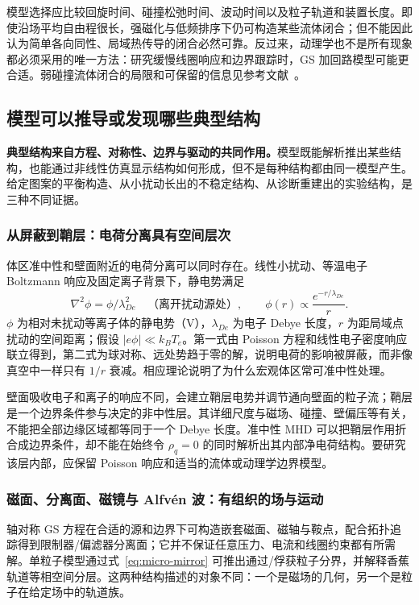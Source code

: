 \documentclass[12pt,fontset=none]{ctexart}
\numberwithin{equation}{section}
\numberwithin{table}{section}
\numberwithin{figure}{section}
\begin{document}
模型选择应比较回旋时间、碰撞松弛时间、波动时间以及粒子轨道和装置长度。即使沿场平均自由程很长，强磁化与低频排序下仍可构造某些流体闭合；但不能因此认为简单各向同性、局域热传导的闭合必然可靠。反过来，动理学也不是所有现象都必须采用的唯一方法：研究缓慢线圈响应和边界跟踪时，GS 加回路模型可能更合适。弱碰撞流体闭合的局限和可保留的信息见参考文献~\cite{Pclosure}。

\subsection{模型可以推导或发现哪些典型结构}\label{sec:micro-structures}

\textbf{典型结构来自方程、对称性、边界与驱动的共同作用。}模型既能解析推出某些结构，也能通过非线性仿真显示结构如何形成，但不是每种结构都由同一模型产生。给定图案的平衡构造、从小扰动长出的不稳定结构、从诊断重建出的实验结构，是三种不同证据。

\subsubsection{从屏蔽到鞘层：电荷分离具有空间层次}

体区准中性和壁面附近的电荷分离可以同时存在。线性小扰动、等温电子 Boltzmann 响应及固定离子背景下，静电势满足
\begin{equation}\label{eq:micro-shielding}
 \nabla^2\phi=\phi/\lambda_{De}^2\quad\text{（离开扰动源处）},
 \qquad \phi(r)\propto\frac{e^{-r/\lambda_{De}}}{r}.
\end{equation}
$\phi$ 为相对未扰动等离子体的静电势（V），$\lambda_{De}$ 为电子 Debye 长度，$r$ 为距局域点扰动的空间距离；假设 $|e\phi|\ll k_BT_e$。第一式由 Poisson 方程和线性电子密度响应联立得到，第二式为球对称、远处势趋于零的解，说明电荷的影响被屏蔽，而非像真空中一样只有 $1/r$ 衰减。相应理论说明了为什么宏观体区常可准中性处理\cite{Pdebye}。

壁面吸收电子和离子的响应不同，会建立鞘层电势并调节通向壁面的粒子流；鞘层是一个边界条件参与决定的非中性层。其详细尺度与磁场、碰撞、壁偏压等有关，不能把全部边缘区域都等同于一个 Debye 长度。准中性 MHD 可以把鞘层作用折合成边界条件，却不能在始终令 $\rho_q=0$ 的同时解析出其内部净电荷结构。要研究该层内部，应保留 Poisson 响应和适当的流体或动理学边界模型。

\subsubsection{磁面、分离面、磁镜与 Alfv\'en 波：有组织的场与运动}

轴对称 GS 方程在合适的源和边界下可构造嵌套磁面、磁轴与鞍点，配合拓扑追踪得到限制器/偏滤器分离面；它并不保证任意压力、电流和线圈约束都有所需解。单粒子模型通过式~\eqref{eq:micro-mirror} 可推出通过/俘获粒子分界，并解释香蕉轨道等相空间分层。这两种结构描述的对象不同：一个是磁场的几何，另一个是粒子在给定场中的轨道族。
\end{document}
